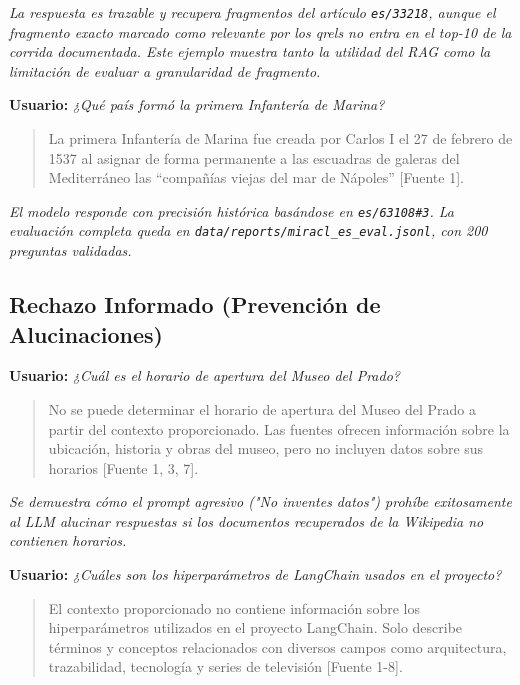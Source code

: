 \documentclass[11pt,a4paper]{article}
\newcommand{\code}[1]{\texttt{#1}}
\begin{document}
\textit{La respuesta es trazable y recupera fragmentos del artículo \code{es/33218}, aunque el fragmento exacto marcado como relevante por los \textit{qrels} no entra en el top-10 de la corrida documentada. Este ejemplo muestra tanto la utilidad del RAG como la limitación de evaluar a granularidad de fragmento.}

\vspace{0.3cm}
\textbf{Usuario:} \textit{¿Qué país formó la primera Infantería de Marina?}

\begin{quote}
La primera Infantería de Marina fue creada por Carlos I el 27 de febrero de 1537 al asignar de forma permanente a las escuadras de galeras del Mediterráneo las ``compañías viejas del mar de Nápoles'' [Fuente 1].
\end{quote}

\textit{El modelo responde con precisión histórica basándose en \code{es/63108\#3}. La evaluación completa queda en \code{data/reports/miracl\_es\_eval.jsonl}, con 200 preguntas validadas.}

\subsection{Rechazo Informado (Prevención de Alucinaciones)}

\textbf{Usuario:} \textit{¿Cuál es el horario de apertura del Museo del Prado?}

\begin{quote}
No se puede determinar el horario de apertura del Museo del Prado a partir del contexto proporcionado. Las fuentes ofrecen información sobre la ubicación, historia y obras del museo, pero no incluyen datos sobre sus horarios [Fuente 1, 3, 7].
\end{quote}

\textit{Se demuestra cómo el prompt agresivo (\textit{"No inventes datos"}) prohíbe exitosamente al LLM alucinar respuestas si los documentos recuperados de la Wikipedia no contienen horarios.}

\vspace{0.3cm}
\textbf{Usuario:} \textit{¿Cuáles son los hiperparámetros de LangChain usados en el proyecto?}

\begin{quote}
El contexto proporcionado no contiene información sobre los hiperparámetros utilizados en el proyecto LangChain. Solo describe términos y conceptos relacionados con diversos campos como arquitectura, trazabilidad, tecnología y series de televisión [Fuente 1-8].
\end{quote}
\end{document}
